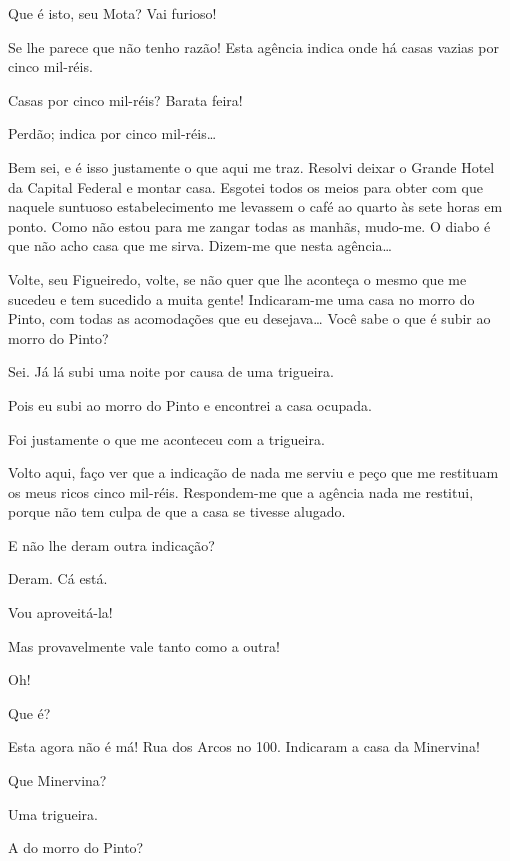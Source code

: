  Que é isto, seu Mota? Vai furioso!

 Se lhe parece que não tenho razão! Esta agência indica onde há casas
vazias por cinco mil-réis.

 Casas por cinco mil-réis? Barata feira!

 Perdão; indica por cinco mil-réis\ldots{}

  Bem sei, e é isso justamente o que aqui me traz.
Resolvi deixar o Grande Hotel da Capital Federal e montar casa. Esgotei todos os
meios para obter com que naquele suntuoso estabelecimento me levassem o café ao
quarto às sete horas em ponto. Como não estou para me zangar todas as
manhãs, mudo-me. O diabo é que não acho casa que me sirva. Dizem-me que nesta
agência\ldots{}

 Volte, seu Figueiredo, volte, se não quer que lhe aconteça o mesmo
que me sucedeu e tem sucedido a muita gente! Indicaram-me uma casa no morro do
Pinto, com todas as acomodações que eu desejava\ldots{} Você sabe o que é subir ao
morro do Pinto?

 Sei. Já lá subi uma noite por causa de uma trigueira.

 Pois eu subi ao morro do Pinto e encontrei a casa ocupada.

 Foi justamente o que me aconteceu com a trigueira.

 Volto aqui, faço ver que a indicação de nada me serviu e peço que me
restituam os meus ricos cinco mil-réis. Respondem-me que a agência nada me
restitui, porque não tem culpa de que a casa se tivesse alugado.

 E não lhe deram outra indicação?

 Deram. Cá está. 

  Vou aproveitá-la!

 Mas provavelmente vale tanto como a outra!

  Oh!

 Que é?

 Esta agora não é má! Rua dos Arcos no 100. Indicaram a casa da
Minervina!

 Que Minervina?

 Uma trigueira.

 A do morro do Pinto?

